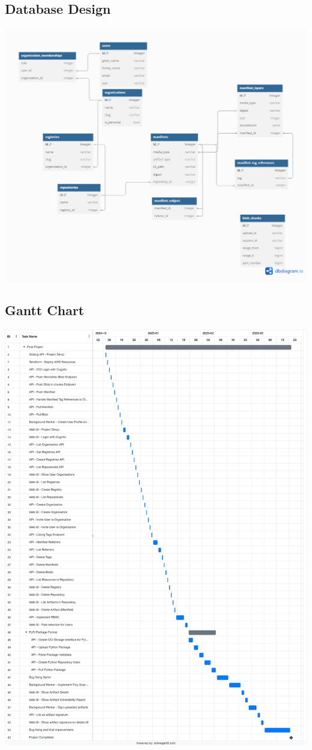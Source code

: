 \documentclass{article}
\begin{document}
  \subsection{Database Design}

  \includegraphics[scale=0.35]{db.png}

  \subsection{Gantt Chart}

  \includegraphics[scale=0.27]{gantt.png}
\end{document}
